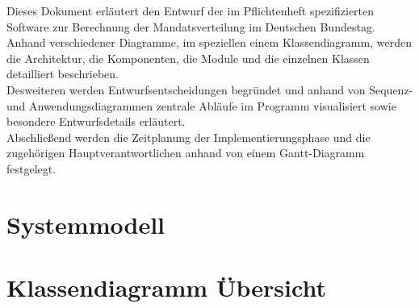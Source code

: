 \documentclass[12pt,a4paper,titlepage]{article}
\begin{document}
Dieses Dokument erläutert den Entwurf der im Pflichtenheft spezifizierten Software zur Berechnung der Mandatsverteilung im Deutschen Bundestag. \\
Anhand verschiedener Diagramme, im speziellen einem Klassendiagramm, werden die Architektur, die Komponenten, die Module und die einzelnen Klassen detailliert beschrieben.\\
Desweiteren werden Entwurfsentscheidungen begründet und anhand von Sequenz- und Anwendungsdiagrammen zentrale Abläufe im Programm visualisiert sowie besondere Entwurfsdetails erläutert.\\
Abschließend werden die Zeitplanung der Implementierungsphase und die zugehörigen Hauptverantwortlichen anhand von einem Gantt-Diagramm festgelegt.

\newpage

\section{Systemmodell}
\section{Klassendiagramm Übersicht}
\end{document}
